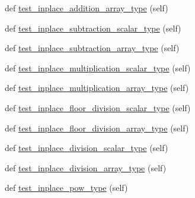 \begin{DoxyCompactItemize}
\item 
def \hyperlink{classnumpy_1_1ma_1_1tests_1_1test__core_1_1TestMaskedArrayInPlaceArithmetics_a01ec65ecdda8fc920fe78123873cbde7}{test\+\_\+inplace\+\_\+addition\+\_\+array\+\_\+type} (self)
\item 
def \hyperlink{classnumpy_1_1ma_1_1tests_1_1test__core_1_1TestMaskedArrayInPlaceArithmetics_ad95cff175e7a8e5b7168910c05ba33c1}{test\+\_\+inplace\+\_\+subtraction\+\_\+scalar\+\_\+type} (self)
\item 
def \hyperlink{classnumpy_1_1ma_1_1tests_1_1test__core_1_1TestMaskedArrayInPlaceArithmetics_a6b6740f02e35a2086b1edfb36bcc280e}{test\+\_\+inplace\+\_\+subtraction\+\_\+array\+\_\+type} (self)
\item 
def \hyperlink{classnumpy_1_1ma_1_1tests_1_1test__core_1_1TestMaskedArrayInPlaceArithmetics_ab1cdca5729effb2282b64c3f26cd2452}{test\+\_\+inplace\+\_\+multiplication\+\_\+scalar\+\_\+type} (self)
\item 
def \hyperlink{classnumpy_1_1ma_1_1tests_1_1test__core_1_1TestMaskedArrayInPlaceArithmetics_afbb32a799202b32b9886d26e1351cdea}{test\+\_\+inplace\+\_\+multiplication\+\_\+array\+\_\+type} (self)
\item 
def \hyperlink{classnumpy_1_1ma_1_1tests_1_1test__core_1_1TestMaskedArrayInPlaceArithmetics_adcf25107e645eb17ccdd9daeaa9c340b}{test\+\_\+inplace\+\_\+floor\+\_\+division\+\_\+scalar\+\_\+type} (self)
\item 
def \hyperlink{classnumpy_1_1ma_1_1tests_1_1test__core_1_1TestMaskedArrayInPlaceArithmetics_aabe81022d947e39c83dfa52fb850b67f}{test\+\_\+inplace\+\_\+floor\+\_\+division\+\_\+array\+\_\+type} (self)
\item 
def \hyperlink{classnumpy_1_1ma_1_1tests_1_1test__core_1_1TestMaskedArrayInPlaceArithmetics_a72f4f99cb9222211caef84b57e4ffdab}{test\+\_\+inplace\+\_\+division\+\_\+scalar\+\_\+type} (self)
\item 
def \hyperlink{classnumpy_1_1ma_1_1tests_1_1test__core_1_1TestMaskedArrayInPlaceArithmetics_ad455090c61b5052c85942d59945ad0e8}{test\+\_\+inplace\+\_\+division\+\_\+array\+\_\+type} (self)
\item 
def \hyperlink{classnumpy_1_1ma_1_1tests_1_1test__core_1_1TestMaskedArrayInPlaceArithmetics_a22a353b116774bf37e92b67116d82ab4}{test\+\_\+inplace\+\_\+pow\+\_\+type} (self)
\end{DoxyCompactItemize}
